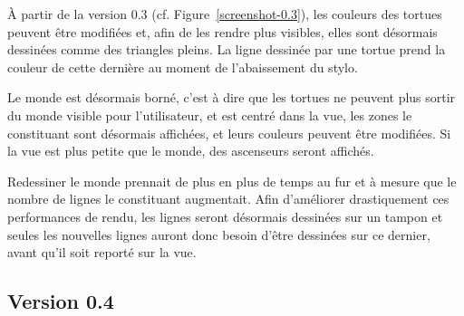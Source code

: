 À partir de la version 0.3 (cf. Figure~\ref{screenshot-0.3}), les couleurs des tortues peuvent être modifiées et, afin de les rendre plus visibles, elles sont désormais dessinées comme des triangles pleins. La ligne dessinée par une tortue prend la couleur de cette dernière au moment de l'abaissement du stylo.

Le monde est désormais borné, c'est à dire que les tortues ne peuvent plus sortir du monde visible pour l'utilisateur, et est centré dans la vue, les zones le constituant sont désormais affichées, et leurs couleurs peuvent être modifiées. Si la vue est plus petite que le monde, des ascenseurs seront affichés.

Redessiner le monde prennait de plus en plus de temps au fur et à mesure que le nombre de lignes le constituant augmentait. Afin d'améliorer drastiquement ces performances de rendu, les lignes seront désormais dessinées sur un tampon et seules les nouvelles lignes auront donc besoin d'être dessinées sur ce dernier, avant qu'il soit reporté sur la vue.

\subsection{Version 0.4}

